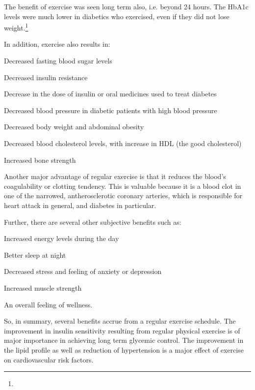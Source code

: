 The benefit of exercise was seen long term also, i.e. beyond 24 hours. The HbA1c levels were much lower in diabetics who exercised, even if they did not lose weight.\footnote{}

In addition, exercise also results in:

\item Decreased fasting blood sugar levels

 \item Decreased insulin resistance

 \item Decrease in the dose of insulin or oral medicines used to treat diabetes

 \item Decreased blood pressure in diabetic patients with high blood pressure

 \item Decreased body weight and abdominal obesity

 \item Decreased blood cholesterol levels, with increase in HDL (the good cholesterol)

 \item Increased bone strength

Another major advantage of regular exercise is that it reduces the blood’s coagulability or clotting tendency. This is valuable because it is a blood clot in one of the narrowed, antherosclerotic coronary arteries, which is responsible for heart attack in general, and diabetes in particular.

Further, there are several other subjective benefits such as:

\item Increased energy levels during the day

 \item Better sleep at night

 \item Decreased stress and feeling of anxiety or depression

 \item Increased muscle strength

 \item An overall feeling of wellness.

So, in summary, several benefits accrue from a regular exercise schedule. The improvement in insulin sensitivity resulting from regular physical exercise is of major importance in achieving long term glycemic control. The improvement in the lipid profile as well as reduction of hypertension is a major effect of exercise on cardiovascular risk factors.

